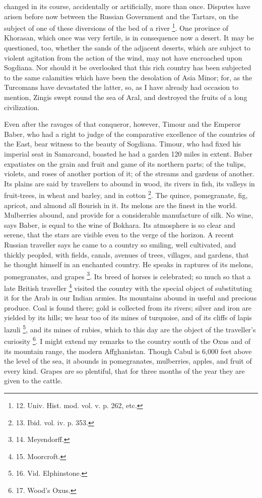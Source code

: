 changed in its course, accidentally or artificially, more than once.
Disputes have arisen before now between the Russian Government and the
Tartars, on the subject of one of these diversions of the bed of a river \footnote{12.
Univ. Hist. mod. vol. v. p. 262, etc.}. One province
of Khorasan, which once was very fertile, is in consequence now a
desert. It may be questioned, too, whether the sands of the adjacent
deserts, which are subject to violent agitation from the action of the
wind, may not have encroached upon Sogdiana. Nor should it be
overlooked that this rich country has been subjected to the same
calamities which have been the desolation of Asia Minor; for, as the
Turcomans have devastated the latter, so, as I have already had
occasion to mention, Zingis swept round the sea of Aral, and destroyed
the fruits of a long civilization.

Even after the ravages of that
conqueror, however, Timour and the Emperor Baber, who had a right to
judge of the comparative excellence of the countries of the East, bear
witness to the beauty of Sogdiana. Timour, who had fixed his imperial
seat in Samarcand, boasted he had a garden 120 miles in extent. Baber
expatiates on the grain and fruit and game of its northern parts; of
the tulips, violets, and roses of another portion of it; of the
streams and gardens of another. Its plains are said by travellers to
abound in wood, its rivers in fish, its valleys in fruit-trees, in
wheat and barley, and in cotton \footnote{13.
Ibid. vol. iv. p. 353.}. The quince, pomegranate, fig, apricot, and almond all
flourish in it. Its melons are the finest in the world. Mulberries
abound, and provide for a considerable manufacture of silk. No wine,
says Baber, is equal to the wine of Bokhara. Its atmosphere is so
clear and serene, that the stars are visible even to the verge of the
horizon. A recent Russian traveller says he came to a country so
smiling, well cultivated, and thickly peopled, with fields, canals,
avenues of trees, villages, and gardens, that he thought himself
in an enchanted country. He speaks in raptures of its melons,
pomegranates, and grapes \footnote{14.
Meyendorff.}.
Its breed of horses is celebrated; so much so that a late British
traveller \footnote{15.
Moorcroft.} visited the
country with the special object of substituting it for the Arab in our
Indian armies. Its mountains abound in useful and precious produce.
Coal is found there; gold is collected from its rivers; silver and
iron are yielded by its hills; we hear too of its mines of turquoise,
and of its cliffs of lapis lazuli \footnote{16.
Vid. Elphinstone.}, and its mines of rubies, which to this day are the object of
the traveller's curiosity \footnote{17.
Wood's Oxus.}.
I might extend my remarks to the country south of the Oxus and of its
mountain range, the modern Affghanistan. Though Cabul is 6,000 feet
above the level of the sea, it abounds in pomegranates, mulberries,
apples, and fruit of every kind. Grapes are so plentiful, that for
three months of the year they are given to the cattle.

